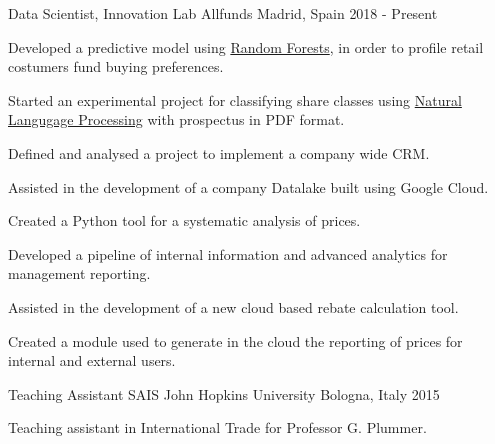 

\begin{cventries}

\cventry
    {Data Scientist, Innovation Lab} %
    {Allfunds} %
    {Madrid, Spain} %
    {2018 - Present} %
    {
        \begin{cvitems} %
            \item {Developed a predictive model using \href{https://en.wikipedia.org/wiki/Random_forest}{Random Forests}, in order to profile retail costumers fund buying preferences.}
            \item {Started an experimental project for classifying share classes using \href{https://en.wikipedia.org/wiki/Natural_language_processing}{Natural Langugage Processing} with prospectus in PDF format.}
            \item {Defined and analysed a project to implement a company wide CRM.}
            \item {Assisted in the development of a company Datalake built using Google Cloud.}
            \item {Created a Python tool for a systematic analysis of prices.}
            \item {Developed a pipeline of internal information and advanced analytics for management reporting.}
            \item {Assisted in the development of a new cloud based rebate calculation tool.}
            \item {Created a module used to generate in the cloud the reporting of prices for internal and external users.}
        \end{cvitems}
    }

\cventry
    {Teaching Assistant} %
    {SAIS John Hopkins University} %
    {Bologna, Italy} %
    {2015} %
    {
        \begin{cvitems} %
            \item {Teaching assistant in International Trade for Professor G. Plummer.}
        \end{cvitems}
    }


\end{cventries}
